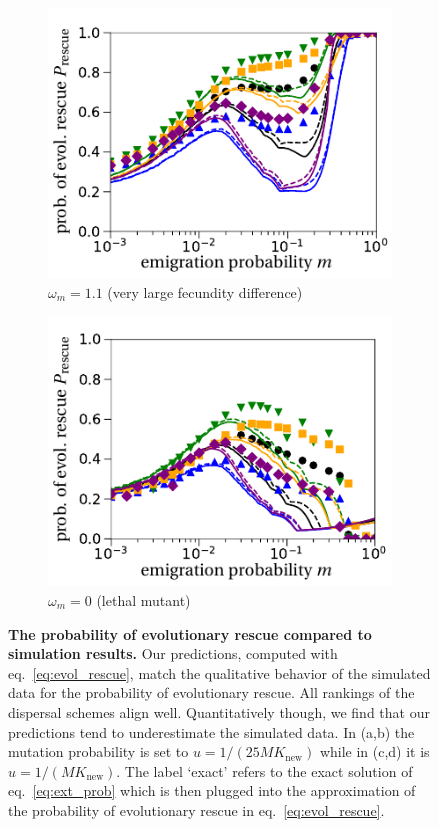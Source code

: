 \documentclass[a4paper,11pt]{article}
\begin{document}
\begin{figure}[t!]
\begin{subfigure}{.5\textwidth}
  		\includegraphics[width=\linewidth]{fig5c.pdf}
  		\caption{$\omega_m=1.1$ (very large fecundity difference)}
	\end{subfigure}%
	\begin{subfigure}{.5\textwidth}
  		\centering
  		\includegraphics[width=\linewidth]{fig5d.pdf}
  		\caption{$\omega_m=0$ (lethal mutant)}
	\end{subfigure}
	\caption{\textbf{The probability of evolutionary rescue compared to simulation results.} \small Our predictions, computed with eq.~\eqref{eq:evol_rescue}, match the qualitative behavior of the simulated data for the probability of evolutionary rescue. All rankings of the dispersal schemes align well. Quantitatively though, we find that our predictions tend to underestimate the simulated data. In (a,b) the mutation probability is set to $u=1/(25MK_{\text{new}})$ while in (c,d) it is $u=1/(MK_{\text{new}})$. The label `exact' refers to the exact solution of eq.~\eqref{eq:ext_prob} which is then plugged into the approximation of the probability of evolutionary rescue in eq.~\eqref{eq:evol_rescue}.}
	\label{fig:rescue}
\end{figure}
\end{document}
